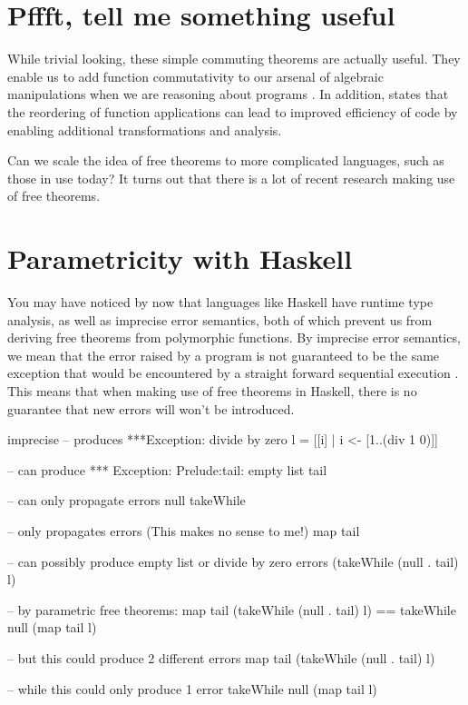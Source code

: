 \section{Pffft, tell me something useful}
While trivial looking, these simple commuting theorems are actually useful. They enable us to add function commutativity to our arsenal of algebraic manipulations when we are reasoning about programs \cite{theoremsForFree}. In addition, \cite{impreciseSemantics} states that the reordering of function applications can lead to improved efficiency of code by enabling additional transformations and analysis.

Can we scale the idea of free theorems to more complicated languages, such as those in use today? It turns out that there is a lot of recent research making use of free theorems.

\section{Parametricity with Haskell}
You may have noticed by now that languages like Haskell have runtime type analysis, as well as imprecise error semantics, both of which prevent us from deriving free theorems from polymorphic functions. By imprecise error semantics, we mean that the error raised by a program is not guaranteed to be the same exception that would be encountered by a straight forward sequential execution \cite{jonesSemantics}. This means that when making use of free theorems in Haskell, there is no guarantee that new errors will won't be introduced.

\begin{SaveVerbatim}{imprecise}
-- produces ***Exception: divide by zero
l = [[i] | i <- [1..(div 1 0)]]

-- can produce *** Exception: Prelude:tail: empty list
tail

-- can only propagate errors
null
takeWhile

-- only propagates errors (This makes no sense to me!)
map tail

-- can possibly produce empty list or divide by zero errors
(takeWhile (null . tail) l)

-- by parametric free theorems:
map tail (takeWhile (null . tail) l) == 
takeWhile null (map tail l)

-- but this could produce 2 different errors
map tail (takeWhile (null . tail) l)

-- while this could only produce 1 error
takeWhile null (map tail l)
\end{SaveVerbatim}

